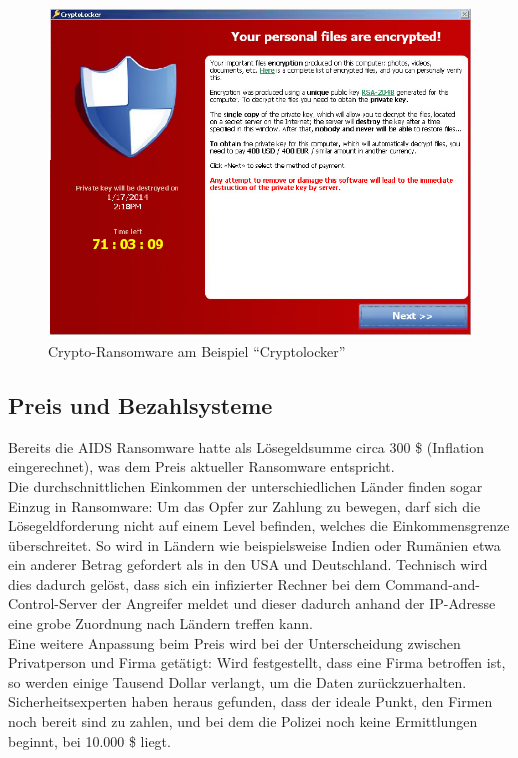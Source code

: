 \begin{figure}[h!]
	\centering
	\includegraphics[width=\textwidth]{img/cryptolocker.png}
	\caption{Crypto-Ransomware am Beispiel ``Cryptolocker''\cite{evolution}}
	\label{fig:cryptolocker}
\end{figure}


\subsection{Preis und Bezahlsysteme}

Bereits die AIDS Ransomware hatte als Lösegeldsumme circa 300 \$ (Inflation eingerechnet), was dem Preis aktueller Ransomware entspricht\cite{evolution}.\\ 
Die durchschnittlichen Einkommen der unterschiedlichen Länder finden sogar Einzug in Ransomware: Um das Opfer zur Zahlung zu bewegen, darf sich die Lösegeldforderung nicht auf einem Level befinden, welches die Einkommensgrenze überschreitet. So wird in Ländern wie beispielsweise Indien oder Rumänien etwa ein anderer Betrag gefordert als in den USA und Deutschland. Technisch wird dies dadurch gelöst, dass sich ein infizierter Rechner bei dem Command-and-Control-Server der Angreifer meldet und dieser dadurch anhand der IP-Adresse eine grobe Zuordnung nach Ländern treffen kann.\\

Eine weitere Anpassung beim Preis wird bei der Unterscheidung zwischen Privatperson und Firma getätigt: Wird festgestellt, dass eine Firma betroffen ist, so werden einige Tausend Dollar verlangt, um die Daten zurückzuerhalten. Sicherheitsexperten haben heraus gefunden, dass der ideale Punkt, den Firmen noch bereit sind zu zahlen, und bei dem die Polizei noch keine Ermittlungen beginnt, bei 10.000 \$ liegt\cite{sweetspot}.\\

